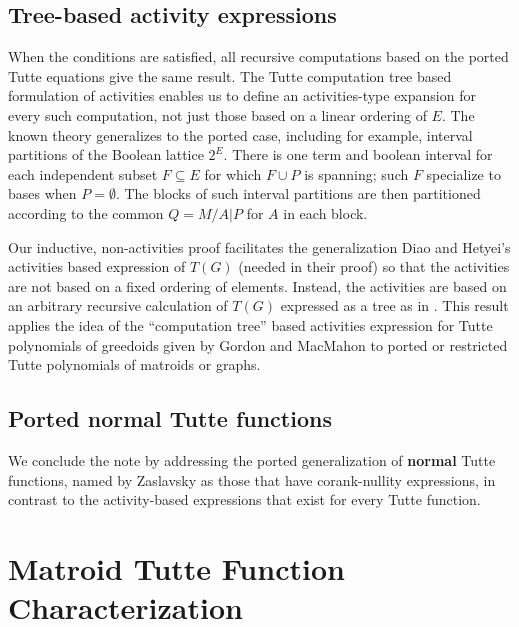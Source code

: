\documentclass[12pt,leqno]{amsart}
\theoremstyle{remark}
\begin{document}
\subsection{Tree-based activity expressions}

When the conditions are satisfied, all recursive
computations based on the ported Tutte equations give the
same result.  The Tutte computation tree based formulation
of activities
\cite{GordonMcMachonGreedoid}
enables us to 
define an activities-type expansion for every such
computation, not just those based on a linear
ordering of $E$.  The known theory generalizes to
the ported case, including for example, interval
partitions of the Boolean lattice $2^{E}$.  
There is 
one term and boolean interval for
each independent subset $F\subseteq E$ for
which $F\cup P$ is spanning; such $F$ specialize
to bases when $P=\emptyset$.
The blocks
of such interval partitions are then partitioned according
to the common $Q=M/A|P$ for $A$ in each block.

Our inductive, non-activities proof 
facilitates
the generalization Diao and Hetyei's activities based
expression of $T(G)$ (needed in their proof)
so that the activities are not based on a fixed
ordering of elements.  Instead, the activities 
are based on an arbitrary recursive calculation of
$T(G)$ expressed as a tree as in \cite{NegamiPoly}.  This result applies the
idea of the ``computation tree'' based activities expression
for Tutte polynomials of greedoids given
by Gordon and MacMahon to ported or restricted Tutte 
polynomials of matroids or graphs\cite{GordonMcMachonGreedoid}.

\subsection{Ported normal Tutte functions}
We conclude the note by addressing the 
ported generalization
of \textbf{normal} Tutte functions, named by 
Zaslavsky as those that have corank-nullity expressions,
in contrast 
to the activity-based expressions that exist for every
Tutte function.


\section{Matroid Tutte Function Characterization}
\label{ParamTutteSec}
\end{document}

